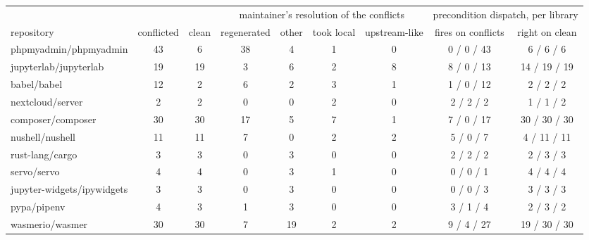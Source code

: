 \begin{tabular}{lcccccccc}
\toprule
& & & \multicolumn{4}{c}{maintainer's resolution of the conflicts} & \multicolumn{2}{c}{precondition dispatch, per library} \\
\cmidrule(lr){4-7}\cmidrule(lr){8-9}
repository & conflicted & clean & regenerated & other & took local & upstream-like & fires on conflicts & right on clean \\
\midrule
phpmyadmin/phpmyadmin & 43 & 6 & 38 & 4 & 1 & 0 & 0 / 0 / 43 & 6 / 6 / 6 \\
jupyterlab/jupyterlab & 19 & 19 & 3 & 6 & 2 & 8 & 8 / 0 / 13 & 14 / 19 / 19 \\
babel/babel & 12 & 2 & 6 & 2 & 3 & 1 & 1 / 0 / 12 & 2 / 2 / 2 \\
nextcloud/server & 2 & 2 & 0 & 0 & 2 & 0 & 2 / 2 / 2 & 1 / 1 / 2 \\
composer/composer & 30 & 30 & 17 & 5 & 7 & 1 & 7 / 0 / 17 & 30 / 30 / 30 \\
nushell/nushell & 11 & 11 & 7 & 0 & 2 & 2 & 5 / 0 / 7 & 4 / 11 / 11 \\
rust-lang/cargo & 3 & 3 & 0 & 3 & 0 & 0 & 2 / 2 / 2 & 2 / 3 / 3 \\
servo/servo & 4 & 4 & 0 & 3 & 1 & 0 & 0 / 0 / 1 & 4 / 4 / 4 \\
jupyter-widgets/ipywidgets & 3 & 3 & 0 & 3 & 0 & 0 & 0 / 0 / 3 & 3 / 3 / 3 \\
pypa/pipenv & 4 & 3 & 1 & 3 & 0 & 0 & 3 / 1 / 4 & 2 / 3 / 2 \\
wasmerio/wasmer & 30 & 30 & 7 & 19 & 2 & 2 & 9 / 4 / 27 & 19 / 30 / 30 \\
\bottomrule
\end{tabular}
